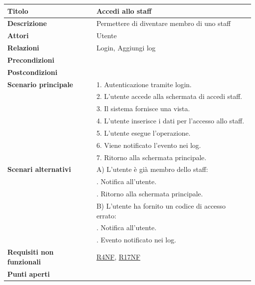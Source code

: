 \documentclass[a4paper]{article}
\begin{document}
  \begin{center}
    \begin{tabularx}{1\textwidth}{l|X}
        \textbf{Titolo} & Accedi allo staff \\
        \hline
        \textbf{Descrizione} & Permettere di diventare membro di uno staff \\
        \hline
        \textbf{Attori} & Utente \\
        \hline
        \textbf{Relazioni} & Login, Aggiungi log \\
        \hline
        \textbf{Precondizioni} &  \\
        \hline
        \textbf{Postcondizioni} &  \\
        \hline
        \textbf{Scenario principale} & 1. Autenticazione tramite login. \\
                                     & 2. L'utente accede alla schermata di accedi staff. \\
                                     & 3. Il sistema fornisce una vista. \\
                                     & 4. L'utente inserisce i dati per l'accesso allo staff. \\
                                     & 5. L'utente esegue l'operazione.\\
                                     & 6. Viene notificato l'evento nei log.\\
                                     & 7. Ritorno alla schermata principale.\\
        \hline
        \textbf{Scenari alternativi} & A) L'utente è già membro dello staff:\\
                                     & \quad 1. Notifica all'utente.\\
                                     & \quad 2. Ritorno alla schermata principale.\\
                                     & B) L'utente ha fornito un codice di accesso errato:\\
                                     & \quad 1. Notifica all'utente.\\
                                     & \quad 1. Evento notificato nei log.\\
        \hline
        \textbf{Requisiti non funzionali} & \hyperlink{R4NF}{R4NF}, \hyperlink{R17NF}{R17NF} \\
        \hline
        \textbf{Punti aperti} & \\
        \hline
    \end{tabularx}
  \end{center}
\end{document}
